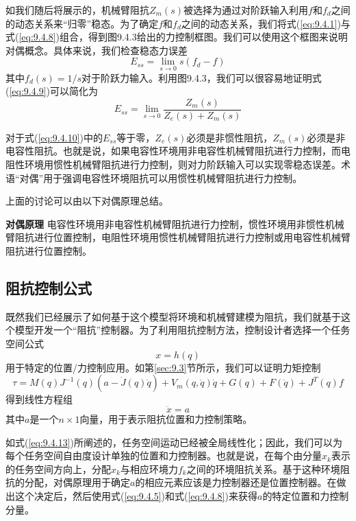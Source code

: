 \documentclass[12pt,a4paper]{ctexart}
\begin{document}
如我们随后将展示的，机械臂阻抗$Z_m(s)$被选择为通过对阶跃输入利用$f$和$f_d$之间的动态关系来``归零''稳态。为了确定$f$和$f_d$之间的动态关系，我们将式(\ref{eq:9.4.1})与式(\ref{eq:9.4.8})组合，得到图9.4.3给出的力控制框图。我们可以使用这个框图来说明对偶概念。具体来说，我们检查稳态力误差
\begin{equation}\label{eq:9.4.9}
E_{ss} = \lim_{s \to 0} s(f_d - f)
\end{equation}
其中$f_d(s) = 1/s$对于阶跃力输入。利用图9.4.3，我们可以很容易地证明式(\ref{eq:9.4.9})可以简化为
\begin{equation}\label{eq:9.4.10}
E_{ss} = \lim_{s \to 0} \frac{Z_m(s)}{Z_e(s) + Z_m(s)}
\end{equation}

对于式(\ref{eq:9.4.10})中的$E_{ss}$等于零，$Z_e(s)$必须是非惯性阻抗，$Z_m(s)$必须是非电容性阻抗。也就是说，如果电容性环境用非电容性机械臂阻抗进行力控制，而电阻性环境用惯性机械臂阻抗进行力控制，则对力阶跃输入可以实现零稳态误差。术语``对偶''用于强调电容性环境阻抗可以用惯性机械臂阻抗进行力控制。

上面的讨论可以由以下对偶原理总结。

\textbf{对偶原理} 电容性环境用非电容性机械臂阻抗进行力控制，惯性环境用非惯性机械臂阻抗进行位置控制，电阻性环境用惯性机械臂阻抗进行力控制或用电容性机械臂阻抗进行位置控制。

\subsection{阻抗控制公式}

既然我们已经展示了如何基于这个模型将环境和机械臂建模为阻抗，我们就基于这个模型开发一个``阻抗''控制器。为了利用阻抗控制方法，控制设计者选择一个任务空间公式
\begin{equation}\label{eq:9.4.11}
x = h(q)
\end{equation}
用于特定的位置/力控制应用。如第\ref{sec:9.3}节所示，我们可以证明力矩控制
\begin{equation}\label{eq:9.4.12}
\tau = M(q)J^{-1}(q)(a - \dot{J}(q)\dot{q}) + V_m(q, \dot{q})\dot{q} + G(q) + F(\dot{q}) + J^T(q)f
\end{equation}
得到线性方程组
\begin{equation}\label{eq:9.4.13}
\ddot{x} = a
\end{equation}
其中$a$是一个$n \times 1$向量，用于表示阻抗位置和力控制策略。

如式(\ref{eq:9.4.13})所阐述的，任务空间运动已经被全局线性化；因此，我们可以为每个任务空间自由度设计单独的位置和力控制器。也就是说，在每个由分量$x_k$表示的任务空间方向上，分配$x_k$与相应环境力$f_k$之间的环境阻抗关系。基于这种环境阻抗的分配，对偶原理用于确定$a$的相应元素应该是力控制器还是位置控制器。在做出这个决定后，然后使用式(\ref{eq:9.4.5})和式(\ref{eq:9.4.8})来获得$a$的特定位置和力控制分量。
\end{document}
